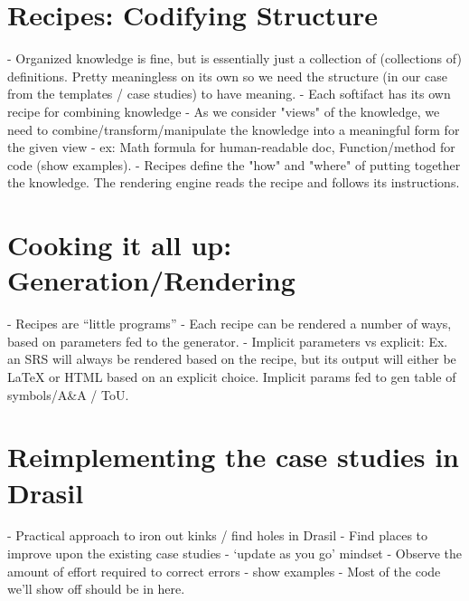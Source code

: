 \section{Recipes: Codifying Structure}
  - Organized knowledge is fine, but is essentially just a collection of (collections of) definitions. Pretty meaningless on its own so we need the structure (in our case from the templates / case studies) to have meaning.
  - Each softifact has its own recipe for combining knowledge
  - As we consider \sfs{} "views" of the knowledge, we need to 
  combine/transform/manipulate the knowledge into a meaningful form for the 
  given view - ex: Math formula for human-readable doc, Function/method for 
  code (show examples).
  - Recipes define the "how" and "where" of putting together the knowledge. The rendering engine reads the recipe and follows its instructions.

\section{Cooking it all up: Generation/Rendering}
  - Recipes are “little programs”
  - Each recipe can be rendered a number of ways, based on parameters fed to the generator.
  -  Implicit parameters vs explicit: Ex. an SRS will always be rendered based on the recipe, but its output will either be LaTeX or HTML based on an explicit choice. Implicit params fed to gen table of symbols/A\&A / ToU.


\section{Reimplementing the case studies in Drasil}
  - Practical approach to iron out kinks / find holes in Drasil
  - Find places to improve upon the existing case studies - ‘update as you go’ mindset
  - Observe the amount of effort required to correct errors - show examples
  - Most of the code we’ll show off should be in here.